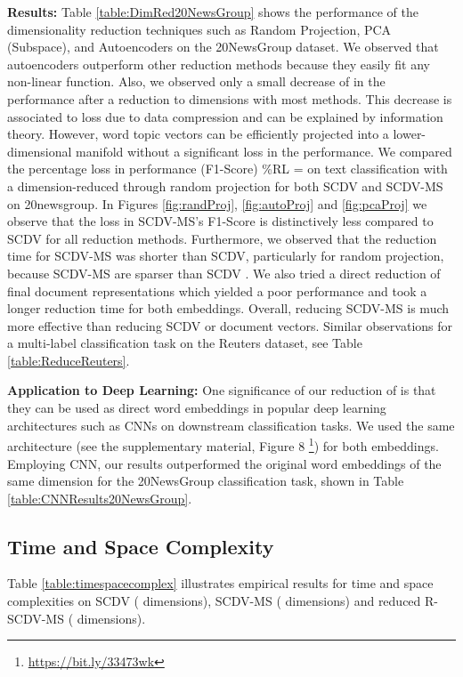 \documentclass{ecai}
\begin{document}
\vspace{0.2cm}
\noindent \textbf{Results:} Table \ref{table:DimRed20NewsGroup} shows the performance of the dimensionality reduction techniques such as Random Projection, PCA (Subspace), and Autoencoders on the 20NewsGroup dataset. We observed that autoencoders outperform other reduction methods because they easily fit any non-linear function. Also, we observed only a small decrease of  in the performance after a reduction to  dimensions with most methods. This decrease is associated to loss due to data compression and can be explained by information theory. However, word topic vectors can be efficiently projected into a lower-dimensional manifold without a significant loss in the performance. 
We compared the percentage loss in performance (F1-Score) \%RL =  on text classification with a dimension-reduced  through random projection for both SCDV and SCDV-MS on 20newsgroup. In Figures \ref{fig:randProj}, \ref{fig:autoProj} and \ref{fig:pcaProj} we observe that the  loss in SCDV-MS's F1-Score is distinctively less compared to SCDV for all reduction methods. Furthermore, we observed that the reduction time for SCDV-MS was shorter than SCDV, particularly for random projection, because SCDV-MS  are sparser than SCDV . We also tried a direct reduction of final document representations which yielded a poor performance and took a longer reduction time for both embeddings. Overall, reducing SCDV-MS  is much more effective than reducing SCDV  or document vectors. Similar observations for a multi-label classification task on the Reuters dataset, see Table \ref{table:ReduceReuters}. 




\vspace{0.5em}
\noindent \textbf{Application to Deep Learning: }One significance of our reduction of  is that they can be used as direct word embeddings in popular deep learning architectures such as CNNs on downstream classification tasks. We used the same architecture (see the supplementary material, Figure 8 \footnote{ \url{https://bit.ly/33473wk}}) for both embeddings. Employing CNN, our results outperformed the original word embeddings of the same dimension for the 20NewsGroup classification task, shown in Table \ref{table:CNNResults20NewsGroup}.
\subsection{Time and Space Complexity}
\label{subsec:timespacecomplexity}
Table \ref{table:timespacecomplex} illustrates empirical results for time and space complexities on SCDV ( dimensions), SCDV-MS ( dimensions) and reduced R-SCDV-MS ( dimensions). 
\end{document}
